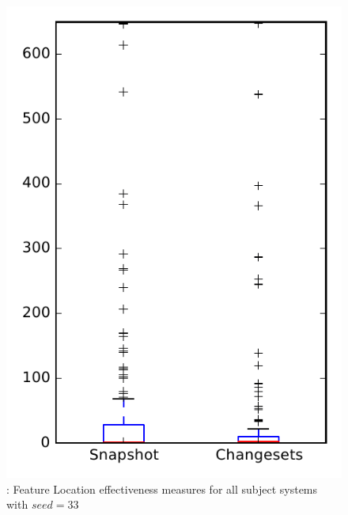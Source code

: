 
\begin{figure}
\centering
\includegraphics[height=0.4\textheight]{figures/flt_seed/rq1_overview_33}
\caption{\rone: Feature Location effectiveness measures for all subject systems with $seed=33$}
\label{fig:flt_seed:rq1:overview}
\end{figure}
